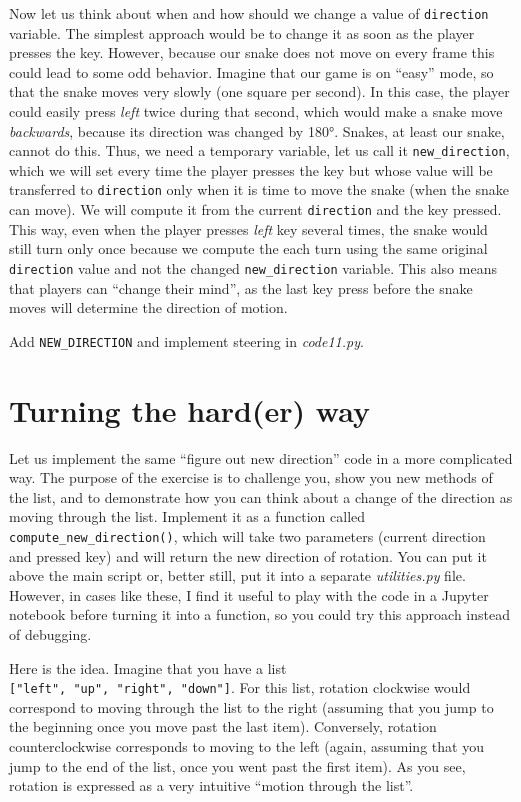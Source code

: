 \documentclass[
]{book}
\begin{document}
Now let us think about when and how should we change a value of \texttt{direction} variable. The simplest approach would be to change it as soon as the player presses the key. However, because our snake does not move on every frame this could lead to some odd behavior. Imagine that our game is on ``easy'' mode, so that the snake moves very slowly (one square per second). In this case, the player could easily press \emph{left} twice during that second, which would make a snake move \emph{backwards}, because its direction was changed by 180°. Snakes, at least our snake, cannot do this. Thus, we need a temporary variable, let us call it \texttt{new\_direction}, which we will set every time the player presses the key but whose value will be transferred to \texttt{direction} only when it is time to move the snake (when the snake can move). We will compute it from the current \texttt{direction} and the key pressed. This way, even when the player presses \emph{left} key several times, the snake would still turn only once because we compute the each turn using the same original \texttt{direction} value and not the changed \texttt{new\_direction} variable. This also means that players can ``change their mind'', as the last key press before the snake moves will determine the direction of motion.

Add \texttt{NEW\_DIRECTION} and implement steering in \emph{code11.py}.

\hypertarget{turning-the-harder-way}{%
\section{Turning the hard(er) way}\label{turning-the-harder-way}}

Let us implement the same ``figure out new direction'' code in a more complicated way. The purpose of the exercise is to challenge you, show you new methods of the list, and to demonstrate how you can think about a change of the direction as moving through the list. Implement it as a function called \texttt{compute\_new\_direction()}, which will take two parameters (current direction and pressed key) and will return the new direction of rotation. You can put it above the main script or, better still, put it into a separate \emph{utilities.py} file. However, in cases like these, I find it useful to play with the code in a Jupyter notebook before turning it into a function, so you could try this approach instead of debugging.

Here is the idea. Imagine that you have a list \texttt{{[}"left",\ "up",\ "right",\ "down"{]}}. For this list, rotation clockwise would correspond to moving through the list to the right (assuming that you jump to the beginning once you move past the last item). Conversely, rotation counterclockwise corresponds to moving to the left (again, assuming that you jump to the end of the list, once you went past the first item). As you see, rotation is expressed as a very intuitive ``motion through the list''.
\end{document}
